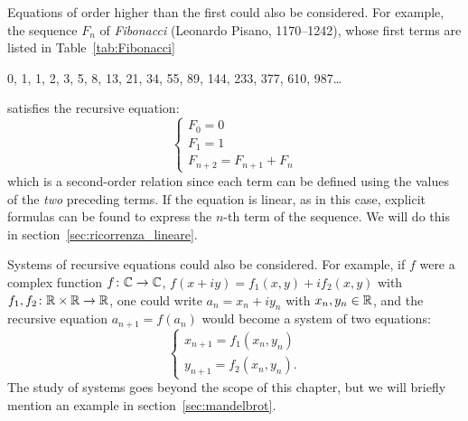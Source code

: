 Equations of order higher than the first could also be considered. For example,
the sequence $F_n$ of \emph{Fibonacci} (Leonardo Pisano, 1170--1242), whose
first terms are listed in Table~\ref{tab:Fibonacci}
\begin{table}
  \begin{center}
  0, 1, 1, 2, 3, 5, 8, 13, 21, 34, 55, 89, 144,
  233, 377, 610, 987\dots
\end{center}
\caption{The first terms of the Fibonacci sequence. Each term is the sum of the two preceding ones.}
\label{tab:Fibonacci}
\end{table}
%
%
%
%
satisfies the recursive equation:
\begin{equation}\label{eq:Fibonacci}
\begin{cases}
  F_0 = 0 \\
  F_1 = 1 \\
  F_{n+2} = F_{n+1} + F_n
\end{cases}
\end{equation}
which is a second-order relation since each term can be defined using the values
of the \emph{two} preceding terms. If the equation is linear, as in this case,
explicit formulas can be found to express the $n$-th term of the sequence. We
will do this in section~\ref{sec:ricorrenza_lineare}.

Systems of recursive equations could also be considered. For example, if $f$
were a complex function $f\colon {\mathbb C} \to {\mathbb C}$, $f(x+iy) = f_1(x,y) + i f_2(x,y)$
with $f_1,f_2 \colon {\mathbb R}\times{\mathbb R}\to{\mathbb R}$, one could write $a_n = x_n + i y_n$
with $x_n, y_n \in {\mathbb R}$, and the recursive equation $a_{n+1} = f(a_n)$ would
become a system of two equations:
\[
  \begin{cases}
    x_{n+1} = f_1(x_n, y_n)\\
    y_{n+1} = f_2(x_n, y_n).
  \end{cases}
\]
The study of systems goes beyond the scope of this chapter, but we will briefly
mention an example in section~\ref{sec:mandelbrot}.